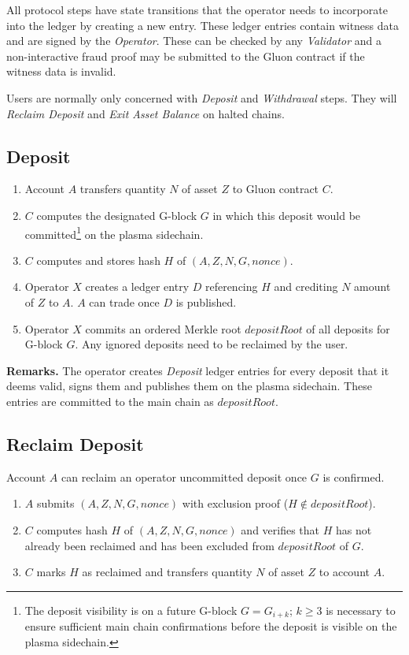 \documentclass[12pt,a4paper]{article}
\begin{document}
All protocol steps have state transitions that the operator needs to incorporate into the ledger by creating a new entry. These ledger entries contain witness data and are signed by the \emph{Operator}. These can be checked by any \emph{Validator} and a non-interactive fraud proof may be submitted to the Gluon contract if the witness data is invalid.

Users are normally only concerned with \emph{Deposit} and \emph{Withdrawal} steps. They will \emph{Reclaim Deposit} and \emph{Exit Asset Balance} on halted chains.

\subsection{Deposit}\label{gp:deposit}
\begin{mdframed}
\begin{enumerate}
    \item Account $A$ transfers quantity $N$ of asset $Z$ to Gluon contract $C$.
    \item $C$ computes the designated G-block $G$ in which this deposit would be committed\footnote{The deposit visibility is on a future G-block $G = G_{i+k}$; $k \geq 3$ is necessary to ensure sufficient main chain confirmations before the deposit is visible on the plasma sidechain.} on the plasma sidechain.
    \item $C$ computes and stores hash $H$ of \((A, Z, N, G, nonce)\).
    \item Operator $X$ creates a ledger entry $D$ referencing $H$ and crediting $N$ amount of $Z$ to $A$. $A$ can trade once $D$ is published.
    \item Operator $X$ commits an ordered Merkle root $depositRoot$ of all deposits for G-block $G$. Any ignored deposits need to be reclaimed by the user.
\end{enumerate}
\end{mdframed}


\textbf{Remarks.}
The operator creates \emph{Deposit} ledger entries for every deposit that it deems valid, signs them and publishes them on the plasma sidechain. These entries are committed to the main chain as $depositRoot$.

\subsection{Reclaim Deposit}\label{gp:reclaim}
Account $A$ can reclaim an operator uncommitted deposit once $G$ is confirmed.
\begin{mdframed}
\begin{enumerate}
    \item $A$ submits \((A, Z, N, G, nonce)\) with exclusion proof (\(H \notin depositRoot\)).
    \item $C$ computes hash $H$ of \((A, Z, N, G, nonce)\) and verifies that $H$ has not already been reclaimed and has been excluded from $depositRoot$ of $G$.
    \item $C$ marks $H$ as reclaimed and transfers quantity $N$ of asset $Z$ to account $A$.
\end{enumerate}
\end{mdframed}
\end{document}
